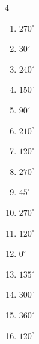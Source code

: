 \begin{multicols}{4}
\begin{enumerate}
  \item $\displaystyle 270^{\circ}$

  \item $\displaystyle 30^{\circ}$

  \item $\displaystyle 240^{\circ}$

  \item $\displaystyle 150^{\circ}$

  \item $\displaystyle 90^{\circ}$

  \item $\displaystyle 210^{\circ}$

  \item $\displaystyle 120^{\circ}$

  \item $\displaystyle 270^{\circ}$

  \item $\displaystyle 45^{\circ}$

  \item $\displaystyle 270^{\circ}$

  \item $\displaystyle 120^{\circ}$

  \item $\displaystyle 0^{\circ}$
        \phantom{$\displaystyle =0$}

\columnbreak %

  \item $\displaystyle 135^{\circ}$

  \item $\displaystyle 300^{\circ}$

  \item $\displaystyle 360^{\circ}$
        \phantom{$\displaystyle =2\pi$}

  \item $\displaystyle 120^{\circ}$


\end{enumerate}
\end{multicols}
